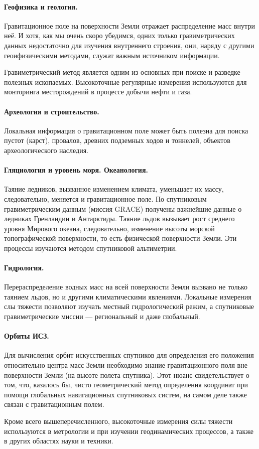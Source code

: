 \documentclass[11pt, a4paper]{article}
\theoremstyle{plain}
\theoremstyle{definition}
\theoremstyle{remark}
\begin{document}
\paragraph{Геофизика и геология.} Гравитационное поле на поверхности Земли отражает распределение масс внутри
неё. И хотя, как мы очень скоро убедимся, одних только гравиметрических данных недостаточно для изучения 
внутреннего строения, они, наряду с другими геоифизическими методами, служат важным источником
информации.\par
Гравиметрический метод является одним из основных при поиске и разведке полезных ископаемых.
Высокоточные регулярные измерения используются для монторинга месторождений в процессе добычи нефти и газа.
\paragraph{Археология и строительство.} Локальная информация о гравитационном поле может быть
полезна для поиска пустот (карст), провалов, древних подземных ходов и тоннелей, объектов археологического
наследия.
\paragraph{Гляциология и уровень моря. Океанология.} Таяние ледников, вызванное изменением климата, уменьшает их
массу, следовательно, меняется и гравитационное поле. По спутниковым гравиметрическим данным (миссия GRACE) получены
важнейшие данные о ледниках Гренландии и Антарктиды. Таяние льдов вызывает рост среднего
уровня Мирового океана, следовательно, изменение высоты морской топографической поверхности, то есть
физической поверхности Земли. Эти процессы изучаются методом спутниковой альтиметрии.
\paragraph{Гидрология.} Перераспределение водных масс на всей поверхности Земли вызвано не только
таянием льдов, но и другими климатическими явлениями. Локальные измерения слы тяжести позволяют
изучать местный гидрологический режим, а спутниковые гравиметрические миссии --- региональный и даже
глобальный. 
\paragraph{Орбиты ИСЗ.} Для вычисления орбит искусственных спутников для определения его положения относительно центра
масс Земли необходимо знание гравитационного поля вне поверхности Земли (на высоте полета спутника). Этот нюанс свидетельствует
о том, что, казалось бы, чисто геометрический метод определения координат при помощи глобальных
навигационных спутниковых систем, на самом деле также связан с гравитационным полем.

Кроме всего вышеперечисленного, высокоточные измерения силы тяжести используются в метрологии и при изучении
геодинамических процессов, а также в других областях науки и техники.

\printbibliography
\end{document}
